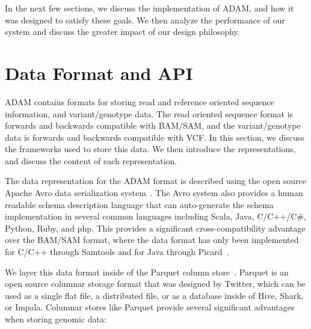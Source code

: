 \documentclass[10pt,twocolumn]{article}
\theoremstyle{plain}
\begin{document}
In the next few sections, we discuss the implementation of ADAM, and how it was designed to satisfy these goals. We then
analyze the performance of our system and discuss the greater impact of our design philosophy.

\section{Data Format and API}
\label{sec:data-format-and-api}

ADAM contains formats for storing read and reference oriented sequence information, and variant/genotype data.
The read oriented sequence format is forwards and backwards compatible with BAM/SAM, and the variant/genotype
data is forwards and backwards compatible with VCF. In this section, we discuss the frameworks used to store this
data. We then introduce the representations, and discuss the content of each representation.

The data representation for the ADAM format is described using the open source Apache Avro data serialization
system~\cite{avro}. The Avro system also provides a human readable schema description language that can
auto-generate the schema implementation in several common languages including Scala, Java, C/C++/C\#,
Python, Ruby, and php. This provides a significant cross-compatibility advantage over the BAM/SAM format,
where the data format has only been implemented for C/C++ through Samtools and for Java through
Picard~\cite{li09,picard}.

We layer this data format inside of the Parquet column store~\cite{parquet}. Parquet is an open source columnar storage
format that was designed by Twitter, which can be used as a single flat file, a distributed file, or as a database inside of
Hive, Shark, or Impala. Columnar stores like Parquet provide several significant advantages when storing genomic data:
\end{document}
